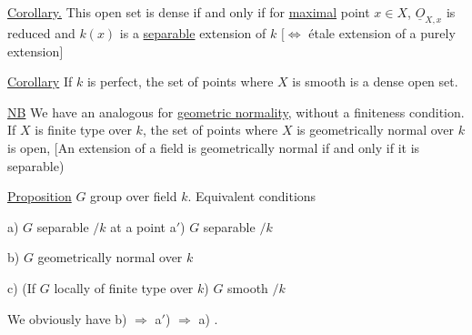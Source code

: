 
\uline{Corollary.} This open set is dense if and only if for  \uline{maximal} point $x\in X$, $\underline O_{X,x}$ is reduced and $k(x)$ is a \uline{separable} extension of $k$ $[\Leftrightarrow$  étale extension of a purely  extension$]$

\uline{Corollary} If $k$ is perfect, the set of points where $X$ is smooth is a dense open set.

\uline{NB} We have an analogous  for \uline{geometric normality}, without a finiteness condition. If $X$ is   finite type over $k$, the set of points where $X$ is geometrically normal over $k$ is open,  [An extension of a field is geometrically normal if and only if it is separable)


\uline{Proposition} $G$ group over field $k$. Equivalent conditions


a) $G$  separable $/k$ at a point \qquad a$'$) $G$ separable $/k$ 

b) $G$ geometrically normal over $k$

c) (If $G$ locally of finite type over $k$) $G$ smooth $/k$

We obviously have  b) $\Rightarrow$ a$'$) $\Longrightarrow$ a) .


